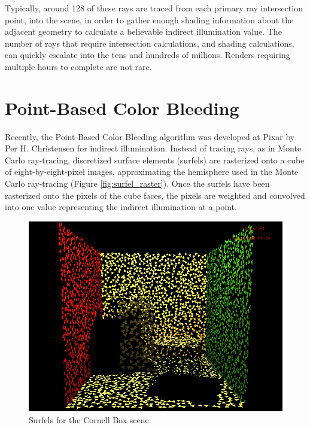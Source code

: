 Typically, around 128 of these rays are traced from each primary ray intersection point, into the scene, in order to gather enough shading information about the adjacent geometry to calculate a believable indirect illumination value. The number of rays that require intersection calculations, and shading calculations, can quickly escalate into the tens and hundreds of millions. Renders requiring multiple hours to complete are not rare.

\section{Point-Based Color Bleeding}
Recently, the Point-Based Color Bleeding algorithm was developed at Pixar by Per H. Christensen \cite{bib:christensen2008} for indirect illumination. Instead of tracing rays, as in Monte Carlo ray-tracing, discretized surface elements (surfels) are rasterized onto a cube of eight-by-eight-pixel images, approximating the hemisphere used in the Monte Carlo ray-tracing (Figure \ref{fig:surfel_raster}). Once the surfels have been rasterized onto the pixels of the cube faces, the pixels are weighted and convolved into one value representing the indirect illumination at a point.

\begin{figure}[p]
   \centering
   \includegraphics[width=130mm]{../img/surfel_cloud_tris.png}
   \captionfonts
   \caption{Surfels for the Cornell Box scene.}
   \label{fig:surfels}
\end{figure}


